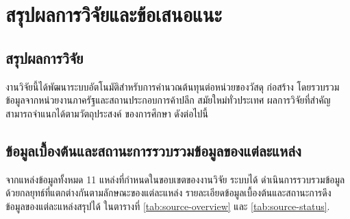 \chapter{สรุปผลการวิจัยและข้อเสนอแนะ}
\label{ch:conclusion}

\section{สรุปผลการวิจัย}
\label{sec:summary}

งานวิจัยนี้ได้พัฒนาระบบอัตโนมัติสำหรับการคำนวณต้นทุนต่อหน่วยของวัสดุ
ก่อสร้าง โดยรวบรวมข้อมูลจากหน่วยงานภาครัฐและสถานประกอบการค้าปลีก
สมัยใหม่ทั่วประเทศ ผลการวิจัยที่สำคัญสามารถจำแนกได้ตามวัตถุประสงค์
ของการศึกษา ดังต่อไปนี้

\section{ข้อมูลเบื้องต้นและสถานะการรวบรวมข้อมูลของแต่ละแหล่ง}
\label{sec:source-status}

จากแหล่งข้อมูลทั้งหมด 11 แหล่งที่กำหนดในขอบเขตของงานวิจัย ระบบได้
ดำเนินการรวบรวมข้อมูลด้วยกลยุทธ์ที่แตกต่างกันตามลักษณะของแต่ละแหล่ง
รายละเอียดข้อมูลเบื้องต้นและสถานะการดึงข้อมูลของแต่ละแหล่งสรุปได้
ในตารางที่ \ref{tab:source-overview} และ \ref{tab:source-status}.

